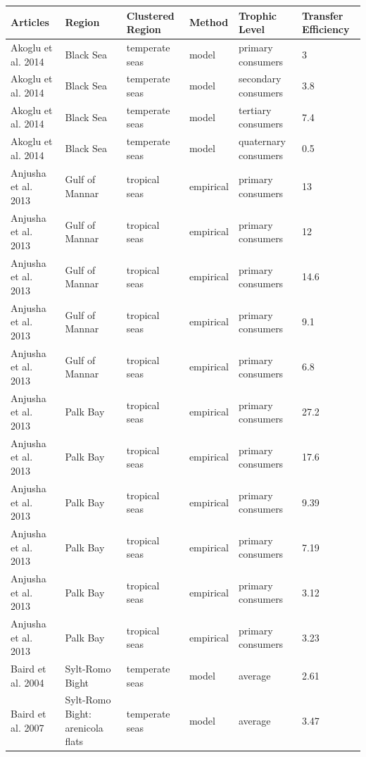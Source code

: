 \documentclass[oneside,12pt,final]{sty/ucthesis-CA2012}
\begin{document}
\begin{mainmatter}
\begin{longtable} {p{4cm}p{3cm}p{2cm}lp{2cm}p{2cm}}
	\toprule
    Articles & Region & Clustered Region & Method & Trophic Level & Transfer Efficiency \\
    \midrule
    \endhead
    Akoglu et al. 2014  & Black Sea & temperate seas & model & primary consumers & 3 \\
    Akoglu et al. 2014   & Black Sea & temperate seas & model & secondary consumers & 3.8 \\
    Akoglu et al. 2014  & Black Sea & temperate seas & model & tertiary consumers & 7.4 \\
    Akoglu et al. 2014  & Black Sea & temperate seas & model & quaternary consumers & 0.5 \\
    Anjusha et al. 2013   & Gulf of Mannar & tropical seas & empirical & primary consumers & 13 \\
    Anjusha et al. 2013   & Gulf of Mannar & tropical seas & empirical & primary consumers & 12 \\
    Anjusha et al. 2013   & Gulf of Mannar & tropical seas & empirical & primary consumers & 14.6 \\
    Anjusha et al. 2013  & Gulf of Mannar & tropical seas & empirical & primary consumers & 9.1 \\
    Anjusha et al. 2013   & Gulf of Mannar & tropical seas & empirical & primary consumers & 6.8 \\
    Anjusha et al. 2013 & Palk Bay & tropical seas & empirical & primary consumers & 27.2 \\
    Anjusha et al. 2013   & Palk Bay & tropical seas & empirical & primary consumers & 17.6 \\
    Anjusha et al. 2013  & Palk Bay & tropical seas & empirical & primary consumers & 9.39 \\
    Anjusha et al. 2013  & Palk Bay & tropical seas & empirical & primary consumers & 7.19 \\
    Anjusha et al. 2013  & Palk Bay & tropical seas & empirical & primary consumers & 3.12 \\
    Anjusha et al. 2013  & Palk Bay & tropical seas & empirical & primary consumers & 3.23 \\
    Baird et al. 2004  & Sylt-Romo Bight & temperate seas & model & average & 2.61 \\
    Baird et al. 2007  & Sylt-Romo Bight: arenicola flats & temperate seas & model & average & 3.47 \\

\end{longtable}
\end{mainmatter}
\end{document}
